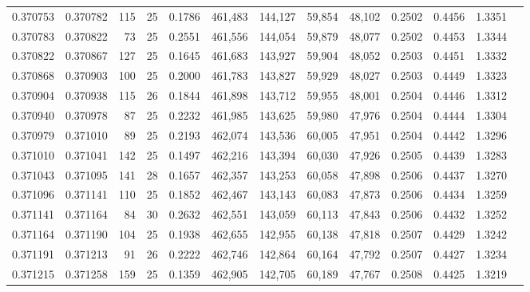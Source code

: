 \begin{tabular}{rrrrrrrrrrrrr}
0.370753 & 0.370782 &   115 &  25 &                                     0.1786 & 461,483 & 144,127 &  59,854 &  48,102 & 0.2502 & 0.4456 & 1.3351 \\
0.370783 & 0.370822 &    73 &  25 &                                     0.2551 & 461,556 & 144,054 &  59,879 &  48,077 & 0.2502 & 0.4453 & 1.3344 \\
0.370822 & 0.370867 &   127 &  25 &                                     0.1645 & 461,683 & 143,927 &  59,904 &  48,052 & 0.2503 & 0.4451 & 1.3332 \\
0.370868 & 0.370903 &   100 &  25 &                                     0.2000 & 461,783 & 143,827 &  59,929 &  48,027 & 0.2503 & 0.4449 & 1.3323 \\
0.370904 & 0.370938 &   115 &  26 &                                     0.1844 & 461,898 & 143,712 &  59,955 &  48,001 & 0.2504 & 0.4446 & 1.3312 \\
0.370940 & 0.370978 &    87 &  25 &                                     0.2232 & 461,985 & 143,625 &  59,980 &  47,976 & 0.2504 & 0.4444 & 1.3304 \\
0.370979 & 0.371010 &    89 &  25 &                                     0.2193 & 462,074 & 143,536 &  60,005 &  47,951 & 0.2504 & 0.4442 & 1.3296 \\
0.371010 & 0.371041 &   142 &  25 &                                     0.1497 & 462,216 & 143,394 &  60,030 &  47,926 & 0.2505 & 0.4439 & 1.3283 \\
0.371043 & 0.371095 &   141 &  28 &                                     0.1657 & 462,357 & 143,253 &  60,058 &  47,898 & 0.2506 & 0.4437 & 1.3270 \\
0.371096 & 0.371141 &   110 &  25 &                                     0.1852 & 462,467 & 143,143 &  60,083 &  47,873 & 0.2506 & 0.4434 & 1.3259 \\
0.371141 & 0.371164 &    84 &  30 &                                     0.2632 & 462,551 & 143,059 &  60,113 &  47,843 & 0.2506 & 0.4432 & 1.3252 \\
0.371164 & 0.371190 &   104 &  25 &                                     0.1938 & 462,655 & 142,955 &  60,138 &  47,818 & 0.2507 & 0.4429 & 1.3242 \\
0.371191 & 0.371213 &    91 &  26 &                                     0.2222 & 462,746 & 142,864 &  60,164 &  47,792 & 0.2507 & 0.4427 & 1.3234 \\
0.371215 & 0.371258 &   159 &  25 &                                     0.1359 & 462,905 & 142,705 &  60,189 &  47,767 & 0.2508 & 0.4425 & 1.3219 \\

\end{tabular}
